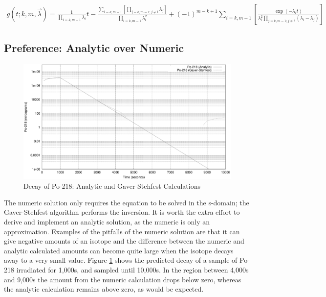 \begin{equation}
\begin{split}
g(t;k,m,\vec{\lambda})
= \frac{1}{\prod_{i=k,m-1} \lambda_i } t
- \frac{\sum_{i=k,m-1} \left[ \prod_{j=k,m-1; j \neq i} \lambda_{j} \right]}
{\prod_{i=k,m-1} \lambda_{i}^2}
+ \left( -1 \right)^{m-k+1}
\sum_{i=k,m-1}
\left[
\frac{\exp(-\lambda_i t)}{\lambda_i^2 \prod_{j=k,m-1;j\neq i}\left(
\lambda_i - \lambda_j \right)}
\right]
\end{split}
\label{eq:stable4}
\end{equation}

\subsection{Preference: Analytic over Numeric}

\begin{figure}
	\begin{center}
		\includegraphics[width=15.0cm]{chapters/activity_code/plots/po-218/po218_po218.eps}
		\caption{Decay of Po-218: Analytic and Gaver-Stehfest Calculations \cite{jeff311}}
		\label{fig:po218decay}
	\end{center}
\end{figure}

The numeric solution only requires the equation to be solved in the s-domain; the Gaver-Stehfest algorithm performs the inversion.  It is worth the extra effort to derive and implement an analytic solution, as the numeric is only an approximation.  Examples of the pitfalls of the numeric solution are that it can give negative amounts of an isotope and the difference between the numeric and analytic calculated amounts can become quite large when the isotope decays away to a very small value.  Figure \ref{fig:po218decay} shows the predicted decay of a sample of Po-218 irradiated for 1,000s, and sampled until 10,000s.  In the region between 4,000s and 9,000s the amount from the numeric calculation drops below zero, whereas the analytic calculation remains above zero, as would be expected.



